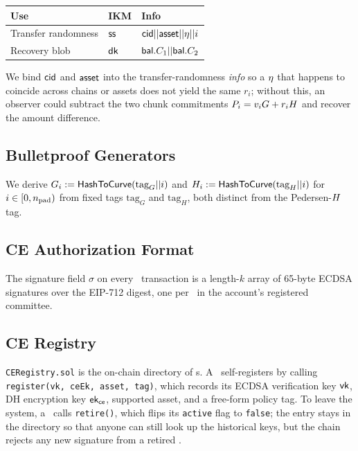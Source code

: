 \begin{table}[h!]
\centering
\begin{tabular}{@{}l l l@{}}
    \toprule
    \textbf{Use} & \textbf{IKM} & \textbf{Info} \\
    \midrule
    Transfer randomness & $\mathsf{ss}$ & $\mathsf{cid} \vert\vert \mathsf{asset} \vert\vert \eta \vert\vert i$ \\
    Recovery blob       & $\textsf{dk}$           & $\mathsf{bal}.C_1 \vert\vert \mathsf{bal}.C_2$ \\
    \bottomrule
\end{tabular}
\end{table}


We bind $\mathsf{cid}$ and $\mathsf{asset}$ into the transfer-randomness \emph{info} so a $\eta$ that happens to coincide across chains or assets does not yield the same $r_i$; without this, an observer could subtract the two chunk commitments $P_{i} = v_i G + r_i H$ and recover the amount difference.

\subsection{Bulletproof Generators}

We derive $G_i := \mathsf{HashToCurve}(\text{tag}_G \vert\vert i)$ and $H_i := \mathsf{HashToCurve}(\text{tag}_H \vert\vert i)$ for $i \in [0, n_{\rm pad})$ from fixed tags $\text{tag}_G$ and $\text{tag}_H$, both distinct from the Pedersen-$H$ tag.

\subsection{CE Authorization Format}

The signature field $\sigma$ on every \CM\ transaction is a length-$k$ array of 65-byte ECDSA signatures over the EIP-712 digest, one per \CE\ in the account's registered committee.

\subsection{CE Registry}
\texttt{CERegistry.sol} is the on-chain directory of \CE s.
A \CE\ self-registers by calling \texttt{register(vk, ceEk, asset, tag)}, which records its ECDSA verification key $\mathsf{vk}$, DH encryption key $\textsf{ek}_{\mathsf{ce}}$, supported asset, and a free-form policy tag.
To leave the system, a \CE\ calls \texttt{retire()}, which flips its \texttt{active} flag to \texttt{false}; the entry stays in the directory so that anyone can still look up the historical keys, but the chain rejects any new signature from a retired \CE.

